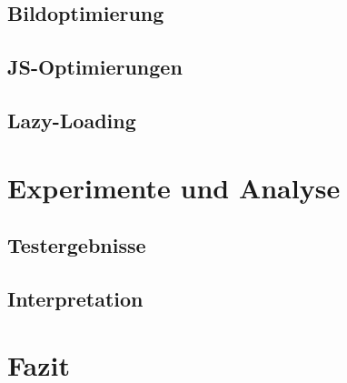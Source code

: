 \documentclass[11pt,a4paper]{article}
\begin{document}
\subsection{Bildoptimierung}
\subsection{JS-Optimierungen}
\subsection{Lazy-Loading}

\section{Experimente und Analyse}

\subsection{Testergebnisse}
\subsection{Interpretation}

\section{Fazit}
\end{document}
